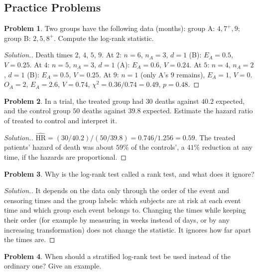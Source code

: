 \documentclass[11pt,a4paper]{article}
\numberwithin{equation}{section}
\theoremstyle{definition}
\newtheorem{problemx}{Problem}[subsection]
\newenvironment{problem}{\begin{problemx}}{\end{problemx}}
\newenvironment{solution}
  {\renewcommand{\qedsymbol}{}\begin{proof}[\textit{Solution}.]}
  {\end{proof}}
\begin{document}
\subsection{Practice Problems}

\begin{problem}
Two groups have the following data (months): group A: $4, 7^+, 9$; group B: $2, 5, 8^+$. Compute the log-rank statistic.
\end{problem}

\begin{solution}
Death times $2$, $4$, $5$, $9$. At $2$: $n = 6$, $n_A = 3$, $d = 1$ (B): $E_A = 0.5$, $V = 0.25$. At $4$: $n = 5$, $n_A = 3$, $d = 1$ (A): $E_A = 0.6$, $V = 0.24$. At $5$: $n = 4$, $n_A = 2$, $d = 1$ (B): $E_A = 0.5$, $V = 0.25$. At $9$: $n = 1$ (only A's $9$ remains), $E_A = 1$,
$V = 0$. $O_A = 2$, $E_A = 2.6$, $V = 0.74$, $\chi^2 = 0.36/0.74 = 0.49$, $p = 0.48$.
\end{solution}

\begin{problem}
In a trial, the treated group had $30$ deaths against $40.2$ expected, and the control group $50$ deaths against $39.8$ expected. Estimate the hazard ratio of treated to control and interpret it.
\end{problem}

\begin{solution}
$\widehat{\text{HR}} = (30/40.2)/(50/39.8) = 0.746/1.256 = 0.59$. The treated patients' hazard of death was about $59\%$ of the controls', a $41\%$ reduction at any time, if the hazards are proportional.
\end{solution}

\begin{problem}
Why is the log-rank test called a rank test, and what does it ignore?
\end{problem}

\begin{solution}
It depends on the data only through the order of the event and censoring times and the group labels: which subjects are at risk at each event time and which group each event belongs to. Changing the times while keeping their order (for example by measuring in weeks instead of days, or by any increasing transformation) does not change the statistic. It ignores how far apart the times are.
\end{solution}

\begin{problem}
When should a stratified log-rank test be used instead of the ordinary one? Give an example.
\end{problem}
\end{document}

